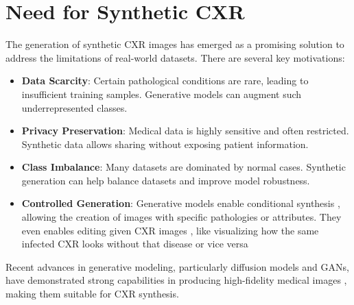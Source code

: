 \section{Need for Synthetic CXR}

The generation of synthetic CXR images has emerged as a promising solution to address the limitations of real-world datasets. There are several key motivations:

\begin{itemize}
    \item \textbf{Data Scarcity}: Certain pathological conditions are rare, leading to insufficient training samples. Generative models can augment such underrepresented classes.
    
    \item \textbf{Privacy Preservation}: Medical data is highly sensitive and often restricted. Synthetic data allows sharing without exposing patient information.
    
    \item \textbf{Class Imbalance}: Many datasets are dominated by normal cases. Synthetic generation can help balance datasets and improve model robustness.
    
    \item \textbf{Controlled Generation}: Generative models enable conditional synthesis \cite{Chambon2022RoentGen}, allowing the creation of images with specific 
    pathologies or attributes. They even enables editing given CXR images \cite{perez-garcia_bond-taylor_radedit}, like visualizing how the same infected CXR looks without that disease
    or vice versa
\end{itemize}

Recent advances in generative modeling, particularly diffusion models and GANs, have demonstrated strong capabilities 
in producing high-fidelity medical images \cite{chambon2024roentgen,Weber2023Cheff,perez-garcia_bond-taylor_radedit}, 
making them suitable for CXR synthesis. 







